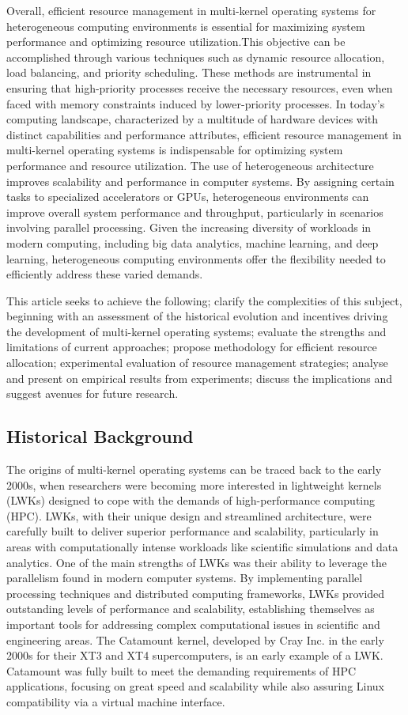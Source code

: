 \documentclass[16pt,a4paper]{article}
\begin{document}
Overall, efficient resource management in multi-kernel operating systems for heterogeneous computing environments is essential for maximizing system performance and optimizing resource utilization.This objective can be accomplished through various techniques such as dynamic resource allocation, load balancing, and priority scheduling. These methods are instrumental in ensuring that high-priority processes receive the necessary resources, even when faced with memory constraints induced by lower-priority processes. In today's computing landscape, characterized by a multitude of hardware devices with distinct capabilities and performance attributes, efficient resource management in multi-kernel operating systems is indispensable for optimizing system performance and resource utilization. The use of heterogeneous architecture improves scalability and performance in computer systems. By assigning certain tasks to specialized accelerators or GPUs, heterogeneous environments can improve overall system performance and throughput, particularly in scenarios involving parallel processing. Given the increasing diversity of workloads in modern computing, including big data analytics, machine learning, and deep learning, heterogeneous computing environments offer the flexibility needed to efficiently address these varied demands. 

This article seeks to achieve the following; clarify the complexities of this subject, beginning with an assessment of the historical evolution and incentives driving the development of multi-kernel operating systems; evaluate the strengths and limitations of current approaches; propose methodology for efficient resource allocation; experimental evaluation of resource management strategies; analyse and present on empirical results from experiments; discuss the implications and suggest avenues for future research.

\subsection{Historical Background}
The origins of multi-kernel operating systems can be traced back to the early 2000s, when researchers were becoming more interested in lightweight kernels (LWKs) designed to cope with the demands of high-performance computing (HPC). LWKs, with their unique design and streamlined architecture, were carefully built to deliver superior performance and scalability, particularly in areas with computationally intense workloads like scientific simulations and data analytics. One of the main strengths of LWKs was their ability to leverage the parallelism found in modern computer systems. By implementing parallel processing techniques and distributed computing frameworks, LWKs provided outstanding levels of performance and scalability, establishing themselves as important tools for addressing complex computational issues in scientific and engineering areas. The Catamount kernel, developed by Cray Inc. in the early 2000s for their XT3 and XT4 supercomputers, is an early example of a LWK. Catamount was fully built to meet the demanding requirements of HPC applications, focusing on great speed and scalability while also assuring Linux compatibility via a virtual machine interface.
\end{document}
